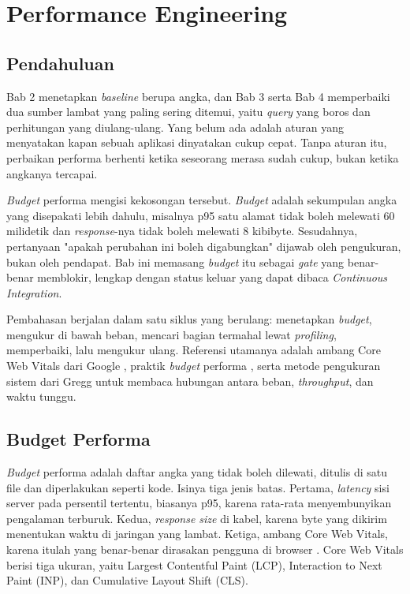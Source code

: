 \chapter{Performance Engineering}
\label{ch:performance}

\section{Pendahuluan}

Bab 2 menetapkan \textit{baseline} berupa angka, dan Bab 3 serta Bab 4
memperbaiki dua sumber lambat yang paling sering ditemui, yaitu \textit{query} yang
boros dan perhitungan yang diulang-ulang. Yang belum ada adalah aturan yang
menyatakan kapan sebuah aplikasi dinyatakan cukup cepat. Tanpa aturan itu,
perbaikan performa berhenti ketika seseorang merasa sudah cukup, bukan ketika
angkanya tercapai.

\textit{Budget} performa mengisi kekosongan tersebut. \textit{Budget} adalah sekumpulan
angka yang disepakati lebih dahulu, misalnya p95 satu alamat tidak boleh
melewati 60 milidetik dan \textit{response}-nya tidak boleh melewati 8 kibibyte.
Sesudahnya, pertanyaan "apakah perubahan ini boleh digabungkan" dijawab oleh
pengukuran, bukan oleh pendapat. Bab ini memasang \textit{budget} itu sebagai
\textit{gate} yang benar-benar memblokir, lengkap dengan status keluar yang
dapat dibaca \textit{Continuous Integration}.

Pembahasan berjalan dalam satu siklus yang berulang: menetapkan \textit{budget},
mengukur di bawah beban, mencari bagian termahal lewat \textit{profiling},
memperbaiki, lalu mengukur ulang. Referensi utamanya adalah ambang Core Web
Vitals dari Google \cite{webdev-vitals}, praktik \textit{budget} performa
\cite{webdev-budget}, serta metode pengukuran sistem dari Gregg
\cite{gregg2020systems} untuk membaca hubungan antara beban, \textit{throughput},
dan waktu tunggu.

\section{Budget Performa}

\textit{Budget} performa adalah daftar angka yang tidak boleh dilewati, ditulis di
satu file dan diperlakukan seperti kode. Isinya tiga jenis batas. Pertama,
\textit{latency} sisi server pada persentil tertentu, biasanya p95, karena rata-rata
menyembunyikan pengalaman terburuk. Kedua, \textit{response size} di kabel, karena
byte yang dikirim menentukan waktu di jaringan yang lambat. Ketiga, ambang
Core Web Vitals, karena itulah yang benar-benar dirasakan pengguna di browser
\cite{webdev-vitals}. Core Web Vitals berisi tiga ukuran, yaitu Largest
Contentful Paint (LCP), Interaction to Next Paint (INP), dan Cumulative
Layout Shift (CLS).

